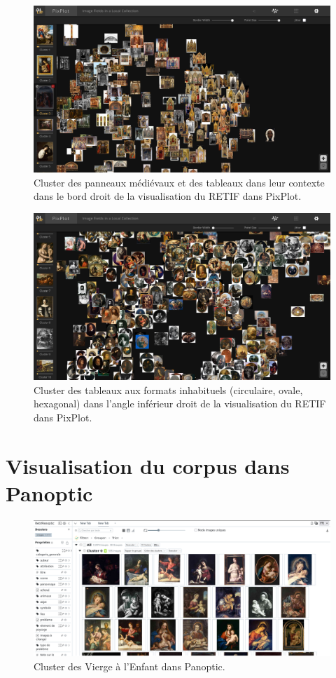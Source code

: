 \begin{figure}[H]
    \centering
    \includegraphics[width=1\textwidth]{annexes/figures/PP-polyptiques.png}
    \caption{Cluster des panneaux médiévaux et des tableaux dans leur contexte dans le bord droit  de la visualisation du RETIF dans PixPlot.}
    \label{fig:PP-polyptiques}
\end{figure}

\begin{figure}[H]
    \centering
    \includegraphics[width=1\textwidth]{annexes/figures/PP-ronds.png}
    \caption{Cluster des tableaux aux formats inhabituels (circulaire, ovale, hexagonal) dans l'angle inférieur droit de la visualisation du RETIF dans PixPlot.}
    \label{fig:PP-ronds}
\end{figure}

\section{Visualisation du corpus dans Panoptic}

\begin{figure}[H]
    \centering
    \includegraphics[width=1\textwidth]{annexes/figures/Pa-Vierges.png}
    \caption{Cluster des Vierge à l'Enfant dans Panoptic.}
    \label{fig:Pa-Vierges}
\end{figure}

